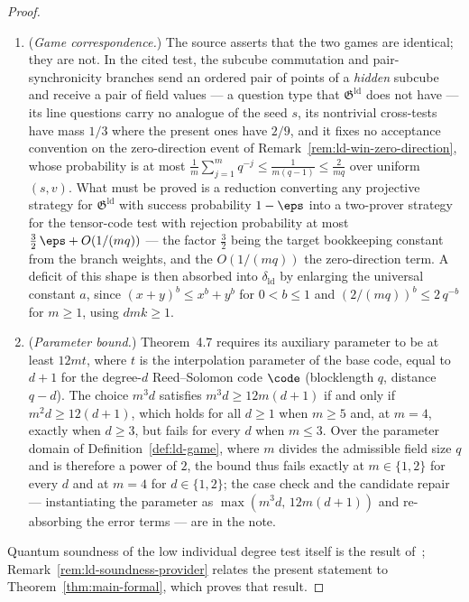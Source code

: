 \begin{proof}
\begin{enumerate}
		\item (\emph{Game correspondence.}) The source asserts that the two games are identical; they are not. In the cited test, the subcube commutation and pair-synchronicity branches send an ordered pair of points of a \emph{hidden} subcube and receive a pair of field values --- a question type that $\mathfrak{G}^{\mathrm{ld}}$ does not have --- its line questions carry no analogue of the seed $s$, its nontrivial cross-tests have mass $1/3$ where the present ones have $2/9$, and it fixes no acceptance convention on the zero-direction event of Remark~\ref{rem:ld-win-zero-direction}, whose probability is at most $\frac1m \sum_{j=1}^m q^{-j} \le \frac{1}{m(q-1)} \le \frac{2}{mq}$ over uniform $(s,v)$. What must be proved is a reduction converting any projective strategy for $\mathfrak{G}^{\mathrm{ld}}$ with success probability $1-\eps$ into a two-prover strategy for the tensor-code test with rejection probability at most $\tfrac32\,\eps + O(1/(mq))$ --- the factor $\tfrac32$ being the target bookkeeping constant from the branch weights, and the $O(1/(mq))$ the zero-direction term. A deficit of this shape is then absorbed into $\delta_{\mathrm{ld}}$ by enlarging the universal constant $a$, since $(x+y)^b \le x^b + y^b$ for $0 < b \le 1$ and $(2/(mq))^b \le 2\,q^{-b}$ for $m \ge 1$, using $dmk \ge 1$.
		\item (\emph{Parameter bound.}) Theorem~4.7 requires its auxiliary parameter to be at least $12mt$, where $t$ is the interpolation parameter of the base code, equal to $d+1$ for the degree-$d$ Reed--Solomon code $\code$ (blocklength $q$, distance $q-d$). The choice $m^3 d$ satisfies $m^3 d \ge 12m(d+1)$ if and only if $m^2 d \ge 12(d+1)$, which holds for all $d \ge 1$ when $m \ge 5$ and, at $m = 4$, exactly when $d \ge 3$, but fails for every $d$ when $m \le 3$. Over the parameter domain of Definition~\ref{def:ld-game}, where $m$ divides the admissible field size $q$ and is therefore a power of $2$, the bound thus fails exactly at $m \in \{1,2\}$ for every $d$ and at $m = 4$ for $d \in \{1,2\}$; the case check and the candidate repair --- instantiating the parameter as $\max(m^3 d,\, 12m(d+1))$ and re-absorbing the error terms --- are in the note.
	\end{enumerate}
	Quantum soundness of the low individual degree test itself is the result of~\cite{Ji2020LowIndividualDegree}; Remark~\ref{rem:ld-soundness-provider} relates the present statement to Theorem~\ref{thm:main-formal}, which proves that result.
\end{proof}

